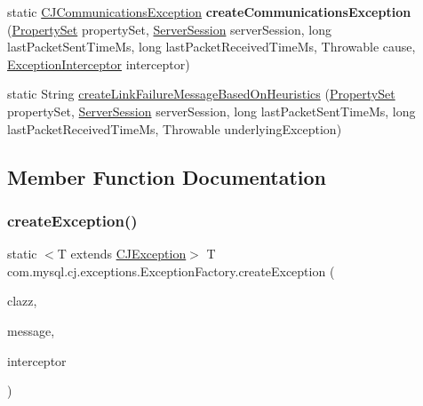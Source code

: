 \begin{DoxyCompactItemize}
static \mbox{\hyperlink{classcom_1_1mysql_1_1cj_1_1exceptions_1_1_c_j_communications_exception}{C\+J\+Communications\+Exception}} {\bfseries create\+Communications\+Exception} (\mbox{\hyperlink{interfacecom_1_1mysql_1_1cj_1_1conf_1_1_property_set}{Property\+Set}} property\+Set, \mbox{\hyperlink{interfacecom_1_1mysql_1_1cj_1_1protocol_1_1_server_session}{Server\+Session}} server\+Session, long last\+Packet\+Sent\+Time\+Ms, long last\+Packet\+Received\+Time\+Ms, Throwable cause, \mbox{\hyperlink{interfacecom_1_1mysql_1_1cj_1_1exceptions_1_1_exception_interceptor}{Exception\+Interceptor}} interceptor)
\item 
static String \mbox{\hyperlink{classcom_1_1mysql_1_1cj_1_1exceptions_1_1_exception_factory_a5d9a3b82bd67fb7fe341fd7120e78989}{create\+Link\+Failure\+Message\+Based\+On\+Heuristics}} (\mbox{\hyperlink{interfacecom_1_1mysql_1_1cj_1_1conf_1_1_property_set}{Property\+Set}} property\+Set, \mbox{\hyperlink{interfacecom_1_1mysql_1_1cj_1_1protocol_1_1_server_session}{Server\+Session}} server\+Session, long last\+Packet\+Sent\+Time\+Ms, long last\+Packet\+Received\+Time\+Ms, Throwable underlying\+Exception)
\end{DoxyCompactItemize}


\subsection{Member Function Documentation}
\mbox{\label{classcom_1_1mysql_1_1cj_1_1exceptions_1_1_exception_factory_a9fb33af1ff5bf7216c592339f88a3f46}} 
\subsubsection{\texorpdfstring{create\+Exception()}{createException()}\hspace{0.1cm}{\footnotesize\ttfamily [1/2]}}
{\footnotesize\ttfamily static $<$T extends \mbox{\hyperlink{classcom_1_1mysql_1_1cj_1_1exceptions_1_1_c_j_exception}{C\+J\+Exception}}$>$ T com.\+mysql.\+cj.\+exceptions.\+Exception\+Factory.\+create\+Exception (\begin{DoxyParamCaption}\item[{Class$<$ T $>$}]{clazz,  }\item[{String}]{message,  }\item[{\mbox{\hyperlink{interfacecom_1_1mysql_1_1cj_1_1exceptions_1_1_exception_interceptor}{Exception\+Interceptor}}}]{interceptor }\end{DoxyParamCaption})\hspace{0.3cm}{\ttfamily [static]}}



